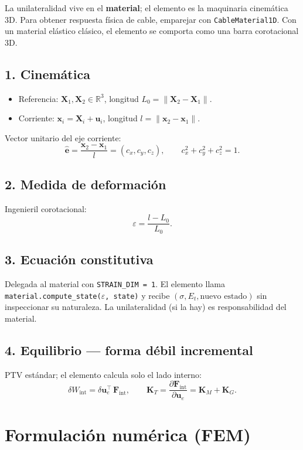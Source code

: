 \documentclass[11pt,letterpaper,oneside]{report}
\begin{document}
La unilateralidad vive en el \textbf{material}; el elemento es la maquinaria cinemática 3D. Para obtener respuesta física de cable, emparejar con \texttt{CableMaterial1D}. Con un material elástico clásico, el elemento se comporta como una barra corotacional 3D.

\subsection{1. Cinemática}
\begin{itemize}
  \item Referencia: $\mathbf X_1, \mathbf X_2 \in \mathbb{R}^3$, longitud $L_0 = \|\mathbf X_2 - \mathbf X_1\|$.
  \item Corriente: $\mathbf x_i = \mathbf X_i + \mathbf u_i$, longitud $l = \|\mathbf x_2 - \mathbf x_1\|$.
\end{itemize}

Vector unitario del eje corriente:
\[
\hat{\mathbf e} = \frac{\mathbf x_2 - \mathbf x_1}{l} = (c_x, c_y, c_z), \qquad c_x^2 + c_y^2 + c_z^2 = 1.
\]

\subsection{2. Medida de deformación}
Ingenieril corotacional:
\[
\varepsilon = \frac{l - L_0}{L_0}.
\]

\subsection{3. Ecuación constitutiva}
Delegada al material con \texttt{STRAIN\_DIM = 1}. El elemento llama \texttt{material.compute\_state(\ensuremath{\varepsilon}, state)} y recibe $(\sigma, E_t, \text{nuevo estado})$ sin inspeccionar su naturaleza. La unilateralidad (si la hay) es responsabilidad del material.

\subsection{4. Equilibrio --- forma débil incremental}
PTV estándar; el elemento calcula solo el lado interno:
\[
\delta W_{\text{int}} = \delta\mathbf u_e^\top\,\mathbf F_{\text{int}}, \qquad \mathbf K_T = \frac{\partial\mathbf F_{\text{int}}}{\partial\mathbf u_e} = \mathbf K_M + \mathbf K_G.
\]


\section{Formulación numérica (FEM)}
\end{document}

